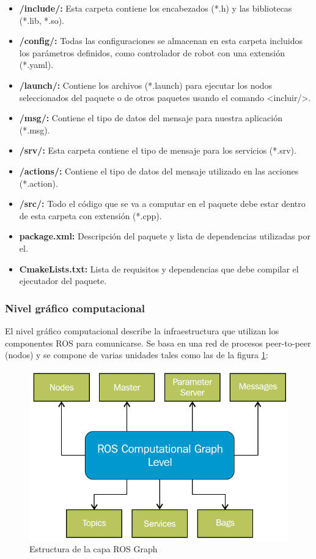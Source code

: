            \begin{itemize}
                \item {\textbf{/include/:} Esta carpeta contiene los encabezados (*.h) y las bibliotecas (*.lib, *.so).}
                \item {\textbf{/config/:} Todas las configuraciones se almacenan en esta carpeta incluidos los parámetros definidos, como controlador de robot con una extensión (*.yaml).}
                \item {\textbf{/launch/:} Contiene los archivos (*.launch) para ejecutar los nodos seleccionados del paquete o de otros paquetes usando el comando <incluir/>.}
                \item {\textbf{/msg/:} Contiene el tipo de datos del mensaje para nuestra aplicación (*.msg).}
                \item {\textbf{/srv/:} Esta carpeta contiene el tipo de mensaje para los servicios (*.srv).}
                \item {\textbf{/actions/:} Contiene el tipo de datos del mensaje utilizado en las acciones (*.action). }
                \item {\textbf{/src/:} Todo el código que se va a computar en el paquete debe estar dentro de esta carpeta con extensión (*.cpp).}
                \item {\textbf{package.xml:} Descripción del paquete y lista de dependencias utilizadas por el.}
                \item {\textbf{CmakeLists.txt:} Lista de requisitos y dependencias que debe compilar el ejecutador del paquete.}
            \end{itemize}

\newpage
            \subsubsection{Nivel gráfico computacional}
            
            El nivel gráfico computacional describe la infraestructura que utilizan los componentes ROS para comunicarse. Se basa en una red de procesos peer-to-peer (nodos) y se compone de varias unidades tales como las de la figura \ref{f:Cap3_conceptos_5}:
            
            \begin{figure}[htb]
                \centering
                \includegraphics[width=0.63\linewidth]{Main/Chapter3/Images3/n_s_a_5.png}
                \caption{Estructura de la capa ROS Graph \cite{lentin_2015}}
                \label{f:Cap3_conceptos_5}
            \end{figure} 
            
